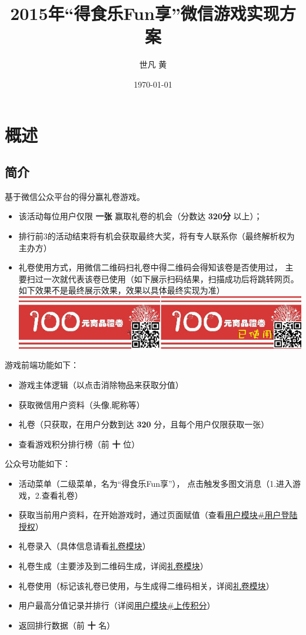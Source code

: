\documentclass[11pt]{article}
\author{世凡 黄}
\date{\today}
\title{2015年“得食乐Fun享”微信游戏实现方案}
\begin{document}
\maketitle
\tableofcontents


\section{概述}
\label{sec-1}
\subsection{简介}
\label{sec-1-1}
基于微信公众平台的得分赢礼卷游戏。
\begin{itemize}
\item 该活动每位用户仅限 \textbf{一张} 赢取礼卷的机会（分数达 \textbf{320分} 以上）；
\item 排行前3的活动结束将有机会获取最终大奖，将有专人联系你（最终解析权为主办方）
\item 礼卷使用方式，用微信二维码扫礼卷中得二维码会得知该卷是否使用过，
主要扫过一次就代表该卷已使用（如下展示扫码结果，扫描成功后将跳转网页。
如下效果不是最终展示效果，效果以具体最终实现为准）
\includegraphics[width=.9\linewidth]{imgs/coupon.jpg}
\end{itemize}

游戏前端功能如下：
\begin{itemize}
\item 游戏主体逻辑（以点击消除物品来获取分值）
\item 获取微信用户资料（头像,昵称等）
\item 礼卷（只获取，在用户分数到达 \textbf{320} 分，且每个用户仅限获取一张）
\item 查看游戏积分排行榜（前 \textbf{十} 位）
\end{itemize}


公众号功能如下：
\begin{itemize}
\item 活动菜单（二级菜单，名为“得食乐Fun享”），
点击触发多图文消息（1.进入游戏，2.查看礼卷）
\item 获取当前用户资料，在开始游戏时，通过页面赋值（查看\hyperref[user_login]{用户模块\#用户登陆授权}）
\item 礼卷录入（具体信息请看\hyperref[coupon]{礼卷模块}）
\item 礼卷生成（主要涉及到二维码生成，详阅\hyperref[coupon]{礼卷模块}）
\item 礼卷使用（标记该礼卷已使用，与生成得二维码相关，详阅\hyperref[coupon]{礼卷模块}）
\item 用户最高分值记录并排行（详阅\hyperref[user_score_submit]{用户模块\#上传积分}）
\item 返回排行数据（前 \textbf{十} 名）
\end{itemize}
\end{document}
